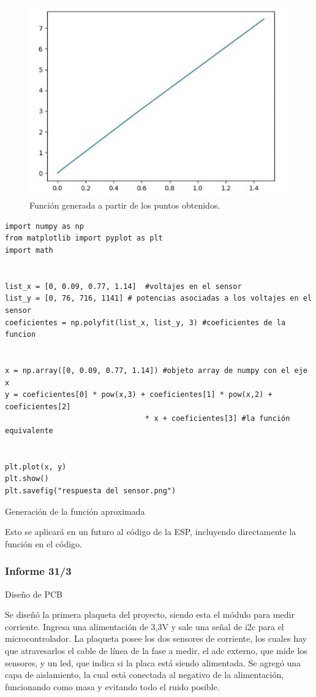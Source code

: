 \begin{figure}[H]
    \centering
    \includegraphics[width=0.75\linewidth]{informes/Screenshot_4.jpg}
    \caption{Función generada a partir de los puntos obtenidos.}
\end{figure}
\begin{listing}[H]
\begin{verbatim}
import numpy as np
from matplotlib import pyplot as plt
import math


list_x = [0, 0.09, 0.77, 1.14]  #voltajes en el sensor
list_y = [0, 76, 716, 1141] # potencias asociadas a los voltajes en el sensor
coeficientes = np.polyfit(list_x, list_y, 3) #coeficientes de la funcion


x = np.array([0, 0.09, 0.77, 1.14]) #objeto array de numpy con el eje x
y = coeficientes[0] * pow(x,3) + coeficientes[1] * pow(x,2) + coeficientes[2] 
                                * x + coeficientes[3] #la función equivalente


plt.plot(x, y)
plt.show()
plt.savefig("respuesta del sensor.png")
\end{verbatim}
\caption{Generación de la función aproximada}
\label{generacion de funcion aprox}
\end{listing}

Esto se aplicará en un futuro al código de la ESP, incluyendo directamente la función en el código.


\subsubsection{Informe 31/3}

Diseño de PCB

Se diseñó la primera plaqueta del proyecto, siendo esta el módulo para medir corriente. Ingresa una alimentación de 3,3V y sale una señal de i2c para el microcontrolador. La plaqueta posee los dos sensores de corriente, los cuales hay que atravesarlos el cable de línea de la fase a medir, el adc externo, que mide los sensores, y un led, que indica si la placa está siendo alimentada. Se agregó una capa de aislamiento, la cual está conectada al negativo de la alimentación, funcionando como masa y evitando todo el ruido posible. \\

